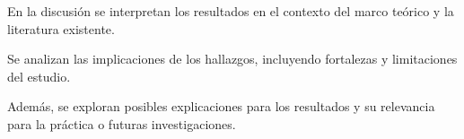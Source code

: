 \label{sec:discusion}

En la discusión se interpretan los resultados en el contexto del marco teórico y la literatura existente.

Se analizan las implicaciones de los hallazgos, incluyendo fortalezas y limitaciones del estudio.

Además, se exploran posibles explicaciones para los resultados y su relevancia para la práctica o futuras investigaciones.